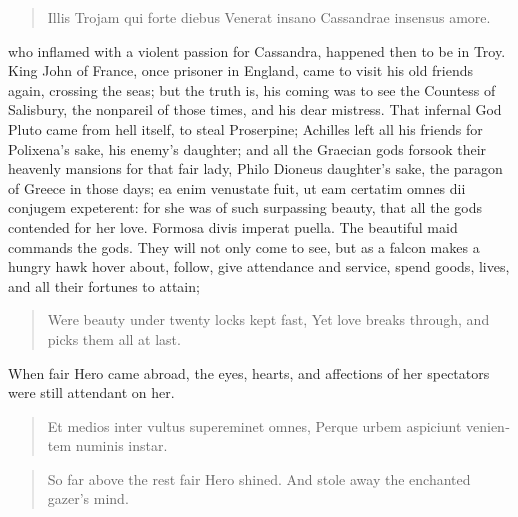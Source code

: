 \begin{latin}
\begin{verse}%
Illis Trojam qui forte diebus
Venerat insano Cassandrae insensus amore.
\end{verse}%
\end{latin}

who inflamed with a violent passion for Cassandra, happened then to be
in Troy. King John of France, once prisoner in England, came to visit
his old friends again, crossing the seas; but the truth is, his coming
was to see the Countess of Salisbury, the nonpareil of those times, and
his dear mistress. That infernal God Pluto came from hell itself, to
steal Proserpine; Achilles left all his friends for Polixena's sake,
his enemy's daughter; and all the Graecian gods forsook their
heavenly mansions for that fair lady, Philo Dioneus daughter's sake,
the paragon of Greece in those days; ea enim venustate fuit, ut eam
certatim omnes dii conjugem expeterent: for she was of such surpassing
beauty, that all the gods contended for her love. Formosa divis
imperat puella. The beautiful maid commands the gods. They will not
only come to see, but as a falcon makes a hungry hawk hover about,
follow, give attendance and service, spend goods, lives, and all their
fortunes to attain;

\begin{verse}%
Were beauty under twenty locks kept fast,
Yet love breaks through, and picks them all at last.
\end{verse}%

When fair Hero came abroad, the eyes, hearts, and affections of
her spectators were still attendant on her.

\begin{latin}
\begin{verse}%
Et medios inter vultus supereminet omnes,
Perque urbem aspiciunt venientem numinis instar.
\end{verse}%
\end{latin}

\begin{verse}%
So far above the rest fair Hero shined.
And stole away the enchanted gazer's mind.
\end{verse}%

